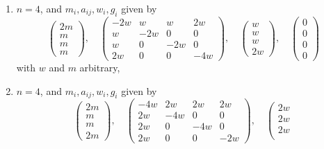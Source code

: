 \begin{lemma}
\begin{enumerate}
$$\begin{matrix}
w \\
2w
\end{matrix}
\right),
\quad
\left(
\begin{matrix}
0 \\
0 \\
0 \\
0
\end{matrix}
\right)
$$
with $w$ and $m$ arbitrary,
\item
\label{item-triple-with-up}
$n = 4$, and $m_i, a_{ij}, w_i, g_i$ given by
$$
\left(
\begin{matrix}
2m \\
m \\
m \\
m
\end{matrix}
\right),
\quad
\left(
\begin{matrix}
-2w & w & w & 2w \\
w & -2w & 0 & 0 \\
w & 0 & -2w & 0 \\
2w & 0 & 0 & -4w
\end{matrix}
\right),
\quad
\left(
\begin{matrix}
w \\
w \\
w \\
2w
\end{matrix}
\right),
\quad
\left(
\begin{matrix}
0 \\
0 \\
0 \\
0
\end{matrix}
\right)
$$
with $w$ and $m$ arbitrary,
\item
\label{item-triple-with-down}
$n = 4$, and $m_i, a_{ij}, w_i, g_i$ given by
$$
\left(
\begin{matrix}
2m \\
m \\
m \\
2m
\end{matrix}
\right),
\quad
\left(
\begin{matrix}
-4w & 2w & 2w & 2w \\
2w & -4w & 0 & 0 \\
2w & 0 & -4w & 0 \\
2w & 0 & 0 & -2w
\end{matrix}
\right),
\quad
\left(
\begin{matrix}
2w \\
2w \\
2w \\

\end{matrix}$$
\end{enumerate}
\end{lemma}
